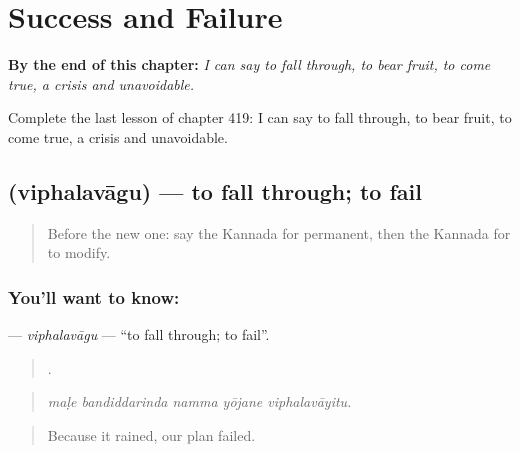 
\chapter{Success and Failure}
\label{ch:ka-success-and-failure}

\begin{chapteropening}
\textbf{By the end of this chapter:} \emph{I can say to fall through, to bear fruit, to come true, a crisis and unavoidable.}

Complete the last lesson of chapter 419: I can say to fall through, to bear fruit, to come true, a crisis and unavoidable.
\end{chapteropening}

\section[\texorpdfstring{\kn{ವಿಫಲವಾಗು} (viphalavāgu)}{ವಿಫಲವಾಗು (viphalavāgu)}]{ (viphalavāgu) — to fall through; to fail}

\label{lesson:KA-C419-viphalavagu}



\begin{quote}
Before the new one: say the Kannada for permanent, then the Kannada for to modify.
\end{quote}

\subsection*{You'll want to know: }
\textbf{} — \emph{viphalavāgu} — \textquotedblleft{}to fall through; to fail\textquotedblright{}.

\begin{quote}
    .
\end{quote}

\begin{quote}
\emph{maḷe bandiddarinda namma yōjane viphalavāyitu.}
\end{quote}

\begin{quote}
Because it rained, our plan failed.
\end{quote}

